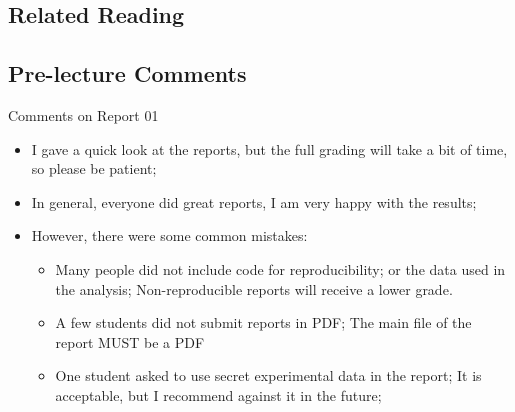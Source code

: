 \subsection{Related Reading}


\subsection{Pre-lecture Comments}

\begin{frame}{Comments on Report 01}
  \begin{itemize}
    \item I gave a quick look at the reports, but the full grading will take a bit of time, so please be patient;
    \item In general, everyone did great reports, I am very happy with the results;
    \item However, there were some common mistakes:
    \begin{itemize}
      \item Many people did not include code for reproducibility; or the data used in the analysis; \alert{Non-reproducible reports will receive a lower grade}.
      \item A few students did not submit reports in PDF; \alert{The main file of the report MUST be a PDF}
      \item One student asked to use secret experimental data in the report; \alert{It is acceptable, but I recommend against it in the future};
    \end{itemize}
  \end{itemize}
\end{frame}
